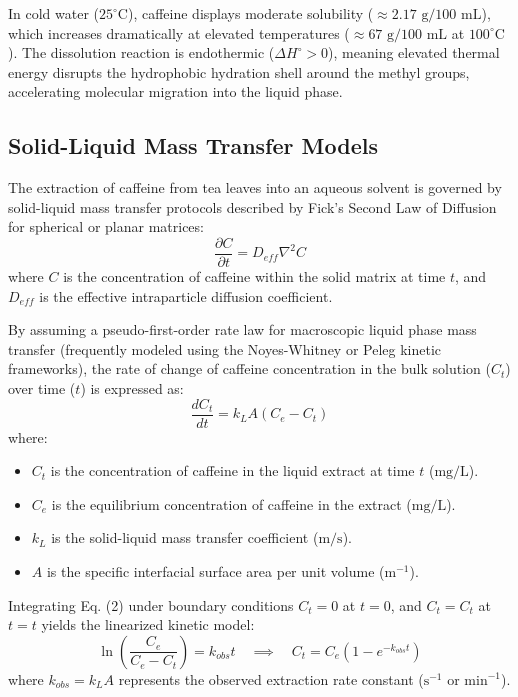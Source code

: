 \documentclass[11pt,a4paper]{article}
\begin{document}
In cold water ($25^\circ\text{C}$), caffeine displays moderate solubility ($\approx 2.17 \text{ g/100 mL}$), which increases dramatically at elevated temperatures ($\approx 67 \text{ g/100 mL}$ at $100^\circ\text{C}$). The dissolution reaction is endothermic ($\Delta H^\circ > 0$), meaning elevated thermal energy disrupts the hydrophobic hydration shell around the methyl groups, accelerating molecular migration into the liquid phase.

\subsection{Solid-Liquid Mass Transfer Models}
The extraction of caffeine from tea leaves into an aqueous solvent is governed by solid-liquid mass transfer protocols described by Fick's Second Law of Diffusion for spherical or planar matrices:
\begin{equation}
\frac{\partial C}{\partial t} = D_{eff} \nabla^2 C
\end{equation}
where $C$ is the concentration of caffeine within the solid matrix at time $t$, and $D_{eff}$ is the effective intraparticle diffusion coefficient.

By assuming a pseudo-first-order rate law for macroscopic liquid phase mass transfer (frequently modeled using the Noyes-Whitney or Peleg kinetic frameworks), the rate of change of caffeine concentration in the bulk solution ($C_t$) over time ($t$) is expressed as:
\begin{equation}
\frac{dC_t}{dt} = k_L A (C_e - C_t)
\end{equation}
where:
\begin{itemize}
    \item $C_t$ is the concentration of caffeine in the liquid extract at time $t$ ($\text{mg/L}$).
    \item $C_e$ is the equilibrium concentration of caffeine in the extract ($\text{mg/L}$).
    \item $k_L$ is the solid-liquid mass transfer coefficient ($\text{m/s}$).
    \item $A$ is the specific interfacial surface area per unit volume ($\text{m}^{-1}$).
\end{itemize}

Integrating Eq. (2) under boundary conditions $C_t = 0$ at $t = 0$, and $C_t = C_t$ at $t = t$ yields the linearized kinetic model:
\begin{equation}
\ln\left(\frac{C_e}{C_e - C_t}\right) = k_{obs} t \quad \implies \quad C_t = C_e \left(1 - e^{-k_{obs} t}\right)
\end{equation}
where $k_{obs} = k_L A$ represents the observed extraction rate constant ($\text{s}^{-1}$ or $\text{min}^{-1}$).
\end{document}
